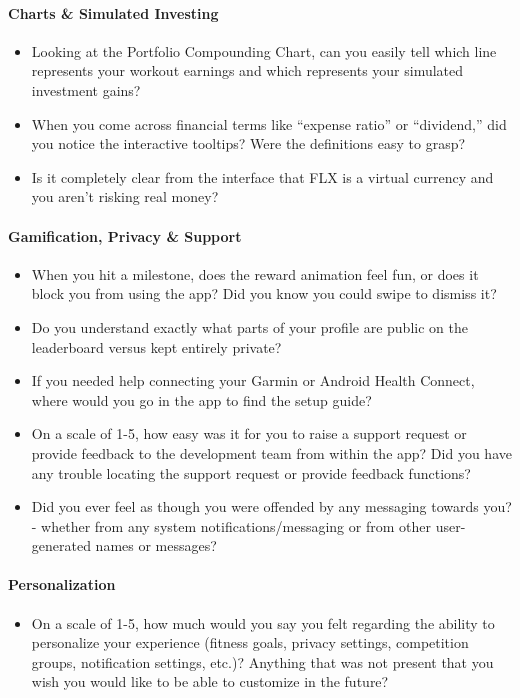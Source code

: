 \documentclass[12pt, titlepage]{article}
\begin{document}
\paragraph{Charts \& Simulated Investing}
\begin{itemize}
  \item Looking at the Portfolio Compounding Chart, can you easily tell which line represents your workout earnings and which represents your simulated investment gains?
  \item When you come across financial terms like ``expense ratio'' or ``dividend,'' did you notice the interactive tooltips? Were the definitions easy to grasp?
  \item Is it completely clear from the interface that FLX is a virtual currency and you aren't risking real money?
\end{itemize}

\paragraph{Gamification, Privacy \& Support}
\begin{itemize}
  \item When you hit a milestone, does the reward animation feel fun, or does it block you from using the app? Did you know you could swipe to dismiss it?
  \item Do you understand exactly what parts of your profile are public on the leaderboard versus kept entirely private?
  \item If you needed help connecting your Garmin or Android Health Connect, where would you go in the app to find the setup guide?
  \item On a scale of 1-5, how easy was it for you to raise a support request or provide feedback to the development team from within the app? Did you have any trouble locating the support request or provide feedback functions?
  \item Did you ever feel as though you were offended by any messaging towards you? - whether from any system notifications/messaging or from other user-generated names or messages?
\end{itemize}

\paragraph{Personalization}
\begin{itemize}
  \item On a scale of 1-5, how much would you say you felt regarding the ability to personalize your experience (fitness goals, privacy settings, competition groups, notification settings, etc.)? Anything that was not present that you wish you would like to be able to customize in the future?
\end{itemize}
\end{document}
